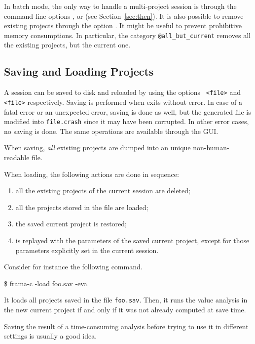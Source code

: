 In batch mode, the only way to handle a multi-project session is through
the command line options ,  or
 (see Section~\ref{sec:then}). It is also possible to
remove existing projects through the option . It
might be useful to prevent prohibitive memory consumptions. In particular, the
category \texttt{@all\_but\_current} removes all the existing projects, but the
current one.

\subsection{Saving and Loading Projects}\label{sec:saveload}

A session can be saved to disk and reloaded by using the options
\texttt{ <file>} and \texttt{ <file>}
respectively. Saving is performed when \FramaC exits without error. In case of a
fatal error or an unexpected error, saving is done as well, but the generated
file is modified into \texttt{file.crash} since it may have been corrupted. In
other error cases, no saving is done. The same operations are available
through the GUI.

When saving, \emph{all} existing projects are dumped into an unique
non-human-readable file.

When loading, the following actions are done in sequence:
\begin{enumerate}
\item all the existing projects of the current session are deleted;
\item all the projects stored in the file are loaded;
\item the saved current project is restored;
\item \FramaC is replayed with the parameters of the saved current project,
  except for those parameters explicitly set in the current session.
\end{enumerate}

Consider for instance the following command.
\begin{frama-c-commands}
\$ frama-c -load foo.sav -eva
\end{frama-c-commands}
It loads all projects saved in the file \texttt{foo.sav}. Then, it runs the
value analysis in the new current project if and only if it was not already
computed at save time.

\begin{convention}
Saving the result of a time-consuming analysis before trying to use it in
different settings is usually a good idea.
\end{convention}

